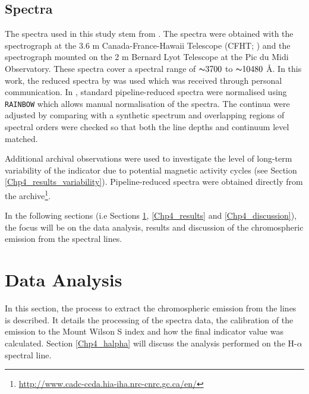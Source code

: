 \subsection{Spectra}
\label{Chp4_obs_spectra}
The spectra used in this study stem from \citet{Bruntt_etal_2012}. The spectra were obtained with the \esp spectrograph at the 3.6 m Canada-France-Hawaii Telescope (CFHT; \citealt{Donati_etal_2006}) and the \narval spectrograph \citep{Auriere_2003} mounted on the 2 m Bernard Lyot Telescope at the Pic du Midi Observatory. These spectra cover a spectral range of ${\thicksim} 3700$ to ${\thicksim} 10480$ \AA. In this work, the reduced spectra by \citet{Bruntt_etal_2012} was used which was received through personal communication. In \citet{Bruntt_etal_2012}, standard pipeline-reduced spectra were normalised using \texttt{RAINBOW} \citep{Bruntt_etal_2010} which allows manual normalisation of the spectra. The continua were adjusted by comparing with a synthetic spectrum and overlapping regions of spectral orders were checked so that both the line depths and continuum level matched.

Additional archival observations were used to investigate the level of long-term variability of the \Rprime indicator due to potential magnetic activity cycles (see Section \ref{Chp4_results_variability}). Pipeline-reduced spectra were obtained directly from the \esp archive\footnote{\url{http://www.cadc-ccda.hia-iha.nrc-cnrc.gc.ca/en/}}.

In the following sections (i.e Sections \ref{Chp4_data_analysis}, \ref{Chp4_results} and \ref{Chp4_discussion}), the focus will be on the data analysis, results and discussion of the chromospheric emission from the \caII spectral lines.

\section{Data Analysis}
\label{Chp4_data_analysis}

In this section, the process to extract the chromospheric emission from the \caII lines is described. It details the processing of the spectra data, the calibration of the emission to the Mount Wilson S index and how the final \Rprime indicator value was calculated. Section \ref{Chp4_halpha} will discuss the analysis performed on the H-$\alpha$ spectral line.

